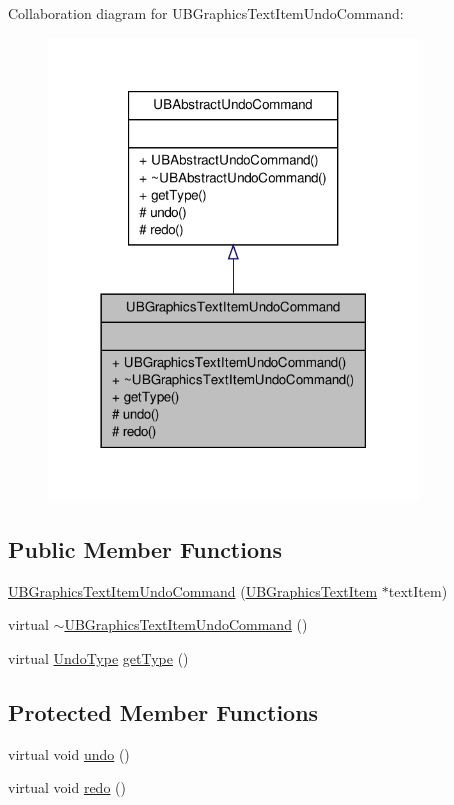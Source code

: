 Collaboration diagram for U\-B\-Graphics\-Text\-Item\-Undo\-Command\-:
\nopagebreak
\begin{figure}[H]
\begin{center}
\leavevmode
\includegraphics[width=278pt]{df/dc6/class_u_b_graphics_text_item_undo_command__coll__graph}
\end{center}
\end{figure}
\subsection*{Public Member Functions}
\begin{DoxyCompactItemize}
\item 
\hyperlink{class_u_b_graphics_text_item_undo_command_a1d546db6203e864057ef08b297e375d8}{U\-B\-Graphics\-Text\-Item\-Undo\-Command} (\hyperlink{class_u_b_graphics_text_item}{U\-B\-Graphics\-Text\-Item} $\ast$text\-Item)
\item 
virtual \hyperlink{class_u_b_graphics_text_item_undo_command_ab107dd5086b8362e092aed08ecec3198}{$\sim$\-U\-B\-Graphics\-Text\-Item\-Undo\-Command} ()
\item 
virtual \hyperlink{class_u_b_abstract_undo_command_a85016029bd4ceb03a8247b3c01e2bd97}{Undo\-Type} \hyperlink{class_u_b_graphics_text_item_undo_command_a9939f93674507129816fc24df4ea1cc5}{get\-Type} ()
\end{DoxyCompactItemize}
\subsection*{Protected Member Functions}
\begin{DoxyCompactItemize}
\item 
virtual void \hyperlink{class_u_b_graphics_text_item_undo_command_aa3eb5c208a6f3d30ea3104b435ffebd5}{undo} ()
\item 
virtual void \hyperlink{class_u_b_graphics_text_item_undo_command_ae96458493969e0d46e23fc0e3eb31f7e}{redo} ()
\end{DoxyCompactItemize}
